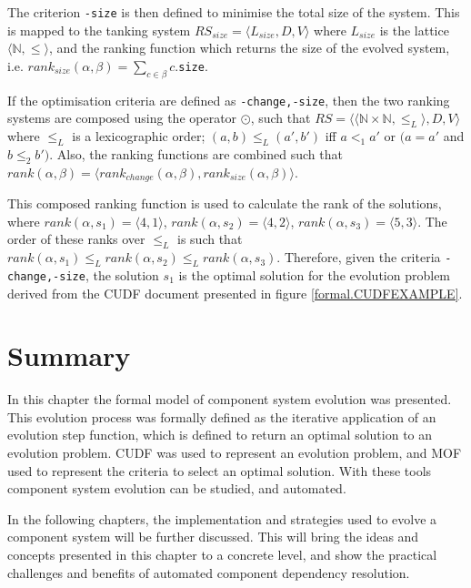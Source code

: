 The criterion \verb+-size+ is then defined to minimise the total size of the system.
This is mapped to the tanking system $RS_{size} = \langle L_{size},D,V \rangle$ where  $L_{size}$ is the lattice  $\langle \mathbb{N}, \leq \rangle$,
and the ranking function which returns the size of the evolved system, i.e.  $rank_{size}(\alpha,\beta) = \sum_{c \in \beta} c$.\verb+size+.

If the optimisation criteria are defined as \verb+-change,-size+, then the two ranking systems are composed using the operator $\odot$,
such that $RS = \langle \langle \mathbb{N} \times \mathbb{N}, \leq_L \rangle, D, V \rangle$ where $\leq_L$ is a lexicographic order;
$(a,b) \leq_{L} (a',b')$ iff $a <_{1} a'$ or $(a = a'$ and $b \leq_{2} b')$.
Also, the ranking functions are combined such that $rank(\alpha,\beta) = \langle rank_{change}(\alpha,\beta), rank_{size}(\alpha,\beta) \rangle$.

This composed ranking function is used to calculate the rank of the solutions, where $rank(\alpha,s_1) = \langle 4, 1\rangle$, $rank(\alpha,s_2) = \langle 4, 2\rangle$, $rank(\alpha,s_3) = \langle 5, 3\rangle$.
The order of these ranks over $\leq_L$ is such that $rank(\alpha,s_1) \leq_L rank(\alpha,s_2) \leq_L rank(\alpha,s_3)$.
Therefore, given the criteria \verb+-change,-size+, the solution $s_1$ is the optimal solution for the evolution problem derived from the CUDF document presented in figure \ref{formal.CUDFEXAMPLE}.


\section{Summary}
In this chapter the formal model of component system evolution was presented.
This evolution process was formally defined as the iterative application of an evolution step function,
which is defined to return an optimal solution to an evolution problem.
CUDF was used to represent an evolution problem, and MOF used to represent the criteria to select an optimal solution.
With these tools component system evolution can be studied, and automated.

In the following chapters, the implementation and strategies used to evolve a component system will be further discussed.
This will bring the ideas and concepts presented in this chapter to a concrete level, and show the practical challenges and benefits of automated component dependency resolution. 